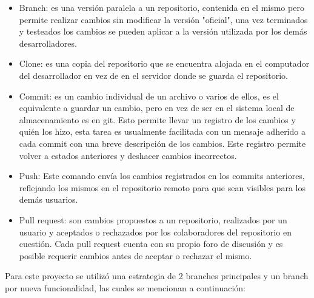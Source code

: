 \begin{itemize}

\item Branch: es una versión paralela a un repositorio, contenida en el mismo pero permite realizar cambios sin modificar la versión "oficial", una vez terminados y testeados los cambios se pueden aplicar a la versión utilizada por los demás desarrolladores.

\item Clone: es una copia del repositorio que se encuentra alojada en el computador del desarrollador en vez de en el servidor donde se guarda el repositorio.

\item Commit: es un cambio individual de un archivo o varios de ellos, es el equivalente a guardar un cambio, pero en vez de ser en el sistema local de almacenamiento es en git. Esto permite llevar un registro de los cambios y quién los hizo, esta tarea es usualmente facilitada con un mensaje adherido a cada commit con una breve descripción de los cambios. Este registro permite volver a estados anteriores y deshacer cambios incorrectos.

\item Push: Este comando envía los cambios registrados en los commits anteriores, reflejando los mismos en el repositorio remoto para que sean visibles para los demás usuarios.

\item Pull request: son cambios propuestos a un repositorio, realizados por un usuario y aceptados o rechazados por los colaboradores del repositorio en cuestión. Cada pull request cuenta con su propio foro de discusión y es posible requerir cambios antes de aceptar o rechazar el mismo.

\end{itemize}

Para este proyecto se utilizó una estrategia de 2 branches principales y un branch por nueva funcionalidad, las cuales se mencionan a continuación:

